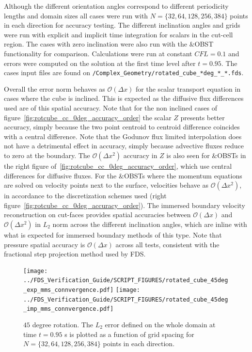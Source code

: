\documentclass[11pt]{book}
\begin{document}
Although the different orientation angles correspond to different periodicity lengths and domain sizes all cases were run with $N=\{32,64,128,256,384\}$ points in each direction for accuracy testing. The different inclination angles and grids were run with explicit and implicit time integration for scalars in the cut-cell region. The cases with zero inclination were also run with the $\&$OBST functionality for comparison. Calculations were run at constant $CFL=0.1$ and errors were computed on the solution at the first time level after $t=0.95$. The cases input files are found on \texttt{/Complex\_Geometry/rotated\_cube\_*deg\_*\_*.fds}.

Overall the error norm behaves as $\mathcal{O}(\Delta x)$ for the scalar transport equation in cases where the cube is inclined. This is expected as the diffusive flux differences used are of this spatial accuracy. Note that for the non inclined cases of figure~\ref{fig:rotcube_cc_0deg_accuracy_order} the scalar $Z$ presents better accuracy, simply because the two point centroid to centroid difference coincides with a central difference. Note that the Godunov flux limited interpolation does not have a detrimental effect in accuracy, simply because advective fluxes reduce to zero at the boundary.
The $\mathcal{O}(\Delta x^2)$ accuracy in $Z$ is also seen for $\&$OBSTs in the right figure of~\ref{fig:rotcube_cc_0deg_accuracy_order}, which use central differences for diffusive fluxes.
For the $\&$OBSTs where the momentum equations are solved on velocity points next to the surface, velocities behave as $\mathcal{O}(\Delta x^2)$, in accordance to the discretization schemes used (right figure~\ref{fig:rotcube_cc_0deg_accuracy_order}). The immersed boundary velocity reconstruction on cut-faces provides spatial accuracies between $\mathcal{O}(\Delta x)$ and $\mathcal{O}(\Delta x^2)$ in $L_2$ norm across the different inclination angles, which are inline with what is expected for immersed boundary methods of this type. Note that pressure spatial accuracy is $\mathcal{O}(\Delta x)$ across all tests, consistent with the fractional step projection method used by FDS.

\begin{figure}[ht]
\centering
\texttt{[image: ../FDS\_Verification\_Guide/SCRIPT\_FIGURES/rotated\_cube\_45deg\_exp\_mms\_connvergence.pdf]}
\texttt{[image: ../FDS\_Verification\_Guide/SCRIPT\_FIGURES/rotated\_cube\_45deg\_imp\_mms\_connvergence.pdf]}
\caption[The {\ct Rotated Cube CC} accuracy order test case]{$45$ degree rotation. The $L_2$ error defined on the whole domain at time $t = 0.95$ s is plotted as a function of grid spacing for $N=\{32,64,128,256,384\}$ points in each direction.}\label{fig:rotcube_cc_45deg_accuracy_order}
\end{figure}
\end{document}
